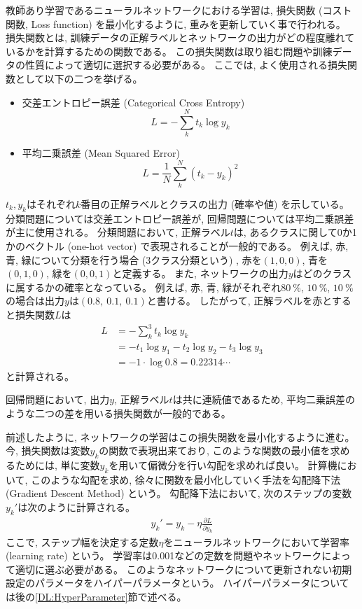 教師あり学習であるニューラルネットワークにおける学習は, 損失関数 (コスト関数, Loss function) を最小化するように, 重みを更新していく事で行われる。
損失関数とは, 訓練データの正解ラベルとネットワークの出力がどの程度離れているかを計算するための関数である。
この損失関数は取り組む問題や訓練データの性質によって適切に選択する必要がある。
ここでは, よく使用される損失関数として以下の二つを挙げる。
\begin{itemize}
  \item 交差エントロピー誤差 (Categorical Cross Entropy)
\begin{equation}
 L = - \sum^N_k t_k \log{y_k}
\end{equation}
  \item 平均二乗誤差 (Mean Squared Error)
\begin{equation}
 L = \frac{1}{N} \sum^N_k(t_k - y_k)^2
\end{equation}
\end{itemize}
$t_k, y_k$はそれぞれ$k$番目の正解ラベルとクラスの出力 (確率や値) を示している。
分類問題については交差エントロピー誤差が, 回帰問題については平均二乗誤差が主に使用される。
\newpage
分類問題において, 正解ラベル$t$は, あるクラスに関して0か1かのベクトル (one-hot vector) で表現されることが一般的である。
例えば, 赤, 青, 緑について分類を行う場合 (3クラス分類という) , 赤を$(1, 0, 0)$, 青を$(0, 1, 0)$, 緑を$(0, 0, 1)$と定義する。
また, ネットワークの出力$y$はどのクラスに属するかの確率となっている。
例えば, 赤, 青, 緑がそれぞれ$80\ \%$, $10\ \%$, $10\ \%$の場合は出力$y$は$(0.8,\ 0.1,\ 0.1)$と書ける。
したがって, 正解ラベルを赤とすると損失関数$L$は
\begin{equation}
 \begin{split}
  L &= - \sum^3_k t_k \log{y_k} \\
    &= - t_1 \log{y_1} - t_2 \log{y_2} - t_3 \log{y_3} \\
    &= - 1 \cdot \log{0.8} = 0.22314 \cdots
 \end{split}
\end{equation}
と計算される。

回帰問題において, 出力$y$, 正解ラベル$t$は共に連続値であるため, 平均二乗誤差のような二つの差を用いる損失関数が一般的である。

前述したように, ネットワークの学習はこの損失関数を最小化するように進む。
今, 損失関数は変数$y_k$の関数で表現出来ており, このような関数の最小値を求めるためには, 単に変数$y_k$を用いて偏微分を行い勾配を求めれば良い。
計算機において, このような勾配を求め, 徐々に関数を最小化していく手法を勾配降下法 (Gradient Descent Method) という。
勾配降下法において, 次のステップの変数$y_k'$は次のように計算される。
\begin{equation}
 \begin{split}
  y_k' = y_k - \eta \frac{\partial L}{\partial y_k}
 \end{split}
\end{equation}
ここで, ステップ幅を決定する定数$\eta$をニューラルネットワークにおいて学習率 (learning rate) という。
学習率は0.001などの定数を問題やネットワークによって適切に選ぶ必要がある。
このようなネットワークについて更新されない初期設定のパラメータをハイパーパラメータという。
ハイパーパラメータについては後の\ref{DL:HyperParameter}節で述べる。

